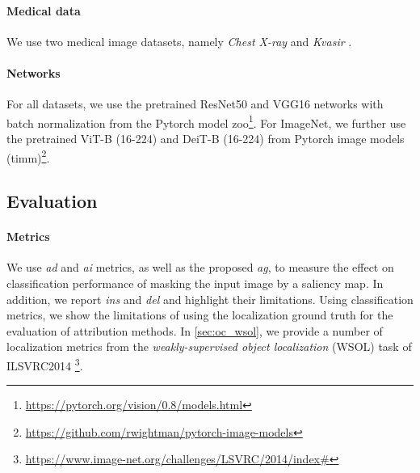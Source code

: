 \paragraph{Medical data}

We use two medical image datasets, namely \emph{Chest X-ray} \autocite{kermany2018labeled} and 
\emph{Kvasir} \autocite{pogorelov2017kvasir}. 


\paragraph{Networks}
\label{sec:oc_setup}

For all datasets, we use the pretrained ResNet50 \autocite{he2016deep} and VGG16 
\autocite{simonyan2015deep} networks with batch normalization \autocite{ioffe2015batch} from the 
Pytorch model zoo\footnote{\url{https://pytorch.org/vision/0.8/models.html}}. For ImageNet, we 
further use the pretrained ViT-B (16-224) \autocite{dosovitskiy2020image} and DeiT-B (16-224) 
\autocite{pmlr-v139-touvron21a} from Pytorch image models (timm)\footnote{\url{
    https://github.com/rwightman/pytorch-image-models}}.



\subsection{Evaluation}
\label{sec:eval}

\paragraph{Metrics}
We use \emph{\gls{ad}} and \emph{\gls{ai}} \autocite{chattopadhay2018grad} metrics, as well 
as the proposed \emph{\gls{ag}}, to measure the effect on classification performance of masking 
the input image by a saliency map. In addition, we report \emph{ins} and \emph{\gls{del}}  
\autocite{petsiuk2018rise} and highlight their limitations. Using classification metrics, we show 
the limitations of using the localization ground truth for the evaluation of attribution methods. 
In \autoref{sec:oc_wsol}, we provide a number of localization metrics from the 
\emph{weakly-supervised object localization} (WSOL) task of ILSVRC2014
\footnote{\url{https://www.image-net.org/challenges/LSVRC/2014/index\#}}.

